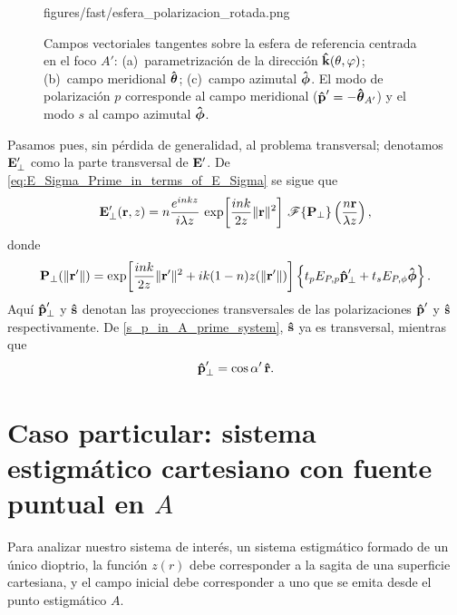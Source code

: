 \begin{figure}[!htbp]
  \centering
    {figures/fast/esfera_polarizacion_rotada.png}
  \caption{Campos vectoriales tangentes sobre la esfera de referencia centrada en el foco $A'$: (a)~parametrización de la dirección $\bm{\hat{\mathbf{k}}}(\theta,\varphi)$; (b)~campo meridional $\bm{\hat{\mathbf{\theta}}}$; (c)~campo azimutal $\bm{\hat{\mathbf{\phi}}}$. El modo de polarización $p$ corresponde al campo meridional ($\bm{\hat{\mathbf{p}}}'=-\bm{\hat{\mathbf{\theta}}}_{A'}$) y el modo $s$ al campo azimutal $\bm{\hat{\mathbf{\phi}}}$.}
  \label{fig:sphere_theta_phi_fields}
\end{figure}

Pasamos pues, sin pérdida de generalidad, al problema transversal; denotamos $\vb E'_\perp$ como la parte transversal de $\vb E'$. De \eqref{eq:E_Sigma_Prime_in_terms_of_E_Sigma} se sigue que
\begin{equation}
\vb{E}'_\perp(\vb r,z)
=
n\frac{e^{inkz}}{i\lambda z}\,
\exp\!\left[
\frac{ink}{2z}\|\vb r\|^2
\right]
\,
\mathscr F\{\vb P_\perp\}
\left(
\frac{n\vb r}{\lambda z}
\right),
\label{eq:E_field_as_FT}
\end{equation}
donde
\begin{equation}
\vb P_\perp(\|\vb r'\|)
=
\exp\!\left[
\frac{ink}{2z}\|\vb r'\|^2
+
ik(1-n)z(\|\vb r'\|)
\right]
\left\{
t_p E_{P,p} \bm{\hat{\mathbf{p}}}'_\perp
+
t_s E_{P,\phi} \bm{\hat{\mathbf{\phi}}}
\right\}.
\end{equation}
Aquí $\bm{\hat{\mathbf{p}}}'_\perp$ y $\bm{\hat{\mathbf{s}}}$ denotan las proyecciones transversales de las polarizaciones $\bm{\hat{\mathbf{p}}}'$ y $\bm{\hat{\mathbf{s}}}$ respectivamente. De \eqref{s_p_in_A_prime_system}, $\bm{\hat{\mathbf{s}}}$ ya es transversal, mientras que
\begin{equation}
  \bm{\hat{\mathbf{p}}}'_\perp = \cos\alpha'\,\bm{\hat{\mathbf{r}}} .
  \label{eq:p_prime_perp}
\end{equation}

\section{Caso particular: sistema estigmático cartesiano con fuente puntual en $A$}

Para analizar nuestro sistema de interés, un sistema estigmático formado de un único dioptrio, la función $z(r)$ debe corresponder a la sagita de una superficie cartesiana, y el campo inicial debe corresponder a uno que se emita desde el punto estigmático $A$.

